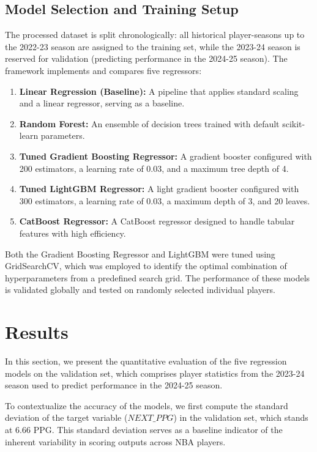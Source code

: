 \documentclass[conference]{IEEEtran}
\begin{document}
\subsection{Model Selection and Training Setup}
The processed dataset is split chronologically: all historical player-seasons up to the 2022-23 season are assigned to the training set, while the 2023-24 season is reserved for validation (predicting performance in the 2024-25 season). The framework implements and compares five regressors:
\begin{enumerate}
    \item \textbf{Linear Regression (Baseline):} A pipeline that applies standard scaling and a linear regressor, serving as a baseline.
    \item \textbf{Random Forest:} An ensemble of decision trees trained with default scikit-learn parameters.
    \item \textbf{Tuned Gradient Boosting Regressor:} A gradient booster configured with 200 estimators, a learning rate of 0.03, and a maximum tree depth of 4.
    \item \textbf{Tuned LightGBM Regressor:} A light gradient booster configured with 300 estimators, a learning rate of 0.03, a maximum depth of 3, and 20 leaves.
    \item \textbf{CatBoost Regressor:} A CatBoost regressor designed to handle tabular features with high efficiency.
\end{enumerate}
Both the Gradient Boosting Regressor and LightGBM were tuned using GridSearchCV, which was employed to identify the optimal combination of hyperparameters from a predefined search grid. The performance of these models is validated globally and tested on randomly selected individual players.

\section{Results}

In this section, we present the quantitative evaluation of the five regression models on the validation set, which comprises player statistics from the 2023-24 season used to predict performance in the 2024-25 season. 

To contextualize the accuracy of the models, we first compute the standard deviation of the target variable ($NEXT\_PPG$) in the validation set, which stands at 6.66 PPG. This standard deviation serves as a baseline indicator of the inherent variability in scoring outputs across NBA players. 
\end{document}

